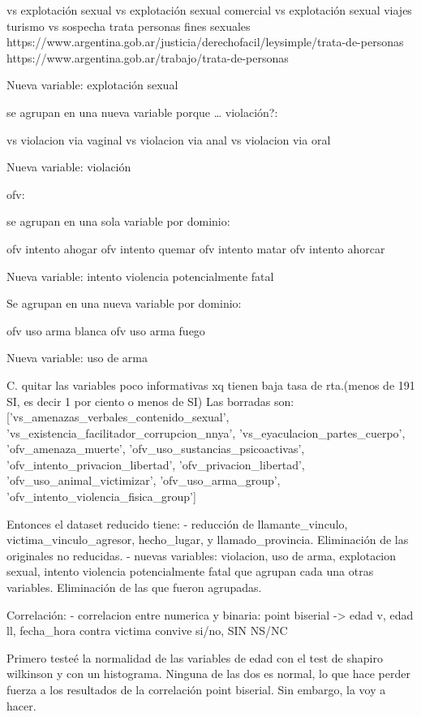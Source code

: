 \documentclass[10pt, spanish]{article}
\begin{document}
vs explotación sexual
vs explotación sexual comercial
vs explotación sexual viajes turismo
vs sospecha trata personas fines sexuales
https://www.argentina.gob.ar/justicia/derechofacil/leysimple/trata-de-personas
https://www.argentina.gob.ar/trabajo/trata-de-personas

Nueva variable: explotación sexual

se agrupan en una nueva variable porque … violación?:

vs violacion via vaginal
vs violacion via anal
vs violacion via oral

Nueva variable: violación

ofv:

se agrupan en una sola variable por dominio:

ofv intento ahogar
ofv intento quemar 
ofv intento matar
ofv intento ahorcar

Nueva variable: intento violencia potencialmente fatal


Se agrupan en una nueva variable por dominio:

ofv uso arma blanca
ofv uso arma fuego

Nueva variable: uso de arma


C. quitar las variables poco informativas xq tienen baja tasa de rta.(menos de 191 SI, es decir 1 por ciento o menos de SI)
Las borradas son: ['vs_amenazas_verbales_contenido_sexual', 'vs_existencia_facilitador_corrupcion_nnya', 'vs_eyaculacion_partes_cuerpo', 'ofv_amenaza_muerte', 'ofv_uso_sustancias_psicoactivas', 'ofv_intento_privacion_libertad', 'ofv_privacion_libertad', 'ofv_uso_animal_victimizar', 'ofv_uso_arma_group', 'ofv_intento_violencia_fisica_group']

Entonces el dataset reducido tiene: 
- reducción de llamante_vinculo, victima_vinculo_agresor, hecho_lugar, y llamado_provincia. Eliminación de las originales no reducidas.
- nuevas variables: violacion, uso de arma, explotacion sexual, intento violencia potencialmente fatal que agrupan cada una otras variables. Eliminación de las que fueron agrupadas.



Correlación:
- correlacion entre numerica y binaria: point biserial -> edad v, edad ll, fecha_hora contra victima convive si/no, SIN NS/NC

Primero testeé la normalidad de las variables de edad con el test de shapiro wilkinson y con un histograma. Ninguna de las dos es normal, lo que hace perder fuerza a los resultados de la correlación point biserial. Sin embargo, la voy a hacer.
\end{document}
